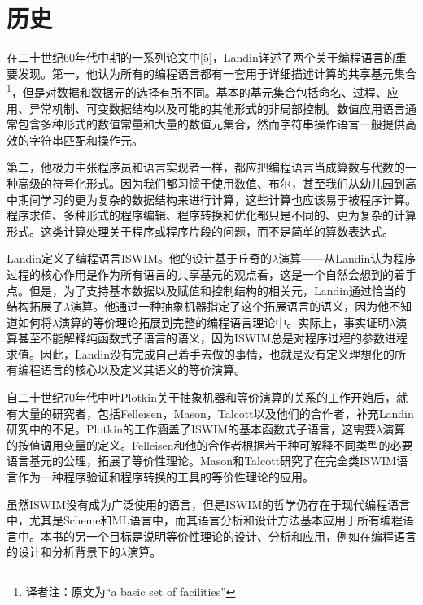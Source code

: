 \documentclass{book}
\begin{document}
\section{历史}
在二十世纪60年代中期的一系列论文中[5]，Landin详述了两个关于编程语言的重要发现。第一，他认为所有的编程语言都有一套用于详细描述计算的共享基元集合\footnote{译者注：原文为“a basic set of facilities”}，但是对数据和数据元的选择有所不同。基本的基元集合包括命名、过程、应用、异常机制、可变数据结构以及可能的其他形式的非局部控制。数值应用语言通常包含多种形式的数值常量和大量的数值元集合，然而字符串操作语言一般提供高效的字符串匹配和操作元。\par
第二，他极力主张程序员和语言实现者一样，都应把编程语言当成算数与代数的一种高级的符号化形式。因为我们都习惯于使用数值、布尔，甚至我们从幼儿园到高中期间学习的更为复杂的数据结构来进行计算，这些计算也应该易于被程序计算。程序求值、多种形式的程序编辑、程序转换和优化都只是不同的、更为复杂的计算形式。这类计算处理关于程序或程序片段的问题，而不是简单的算数表达式。\par
Landin定义了编程语言ISWIM。他的设计基于丘奇的$\lambda$演算——从Landin认为程序过程的核心作用是作为所有语言的共享基元的观点看，这是一个自然会想到的着手点。但是，为了支持基本数据以及赋值和控制结构的相关元，Landin通过恰当的结构拓展了$\lambda$演算。他通过一种抽象机器指定了这个拓展语言的语义，因为他不知道如何将$\lambda$演算的等价理论拓展到完整的编程语言理论中。实际上，事实证明$\lambda$演算甚至不能解释纯函数式子语言的语义，因为ISWIM总是对程序过程的参数进程求值。因此，Landin没有完成自己着手去做的事情，也就是没有定义理想化的所有编程语言的核心以及定义其语义的等价演算。\par
自二十世纪70年代中叶Plotkin关于抽象机器和等价演算的关系的工作开始后，就有大量的研究者，包括Felleisen，Mason，Talcott以及他们的合作者，补充Landin研究中的不足。Plotkin的工作涵盖了ISWIM的基本函数式子语言，这需要$\lambda$演算的按值调用变量的定义。Felleisen和他的合作者根据若干种可解释不同类型的必要语言基元的公理，拓展了等价性理论。Mason和Talcott研究了在完全类ISWIM语言作为一种程序验证和程序转换的工具的等价性理论的应用。\par
虽然ISWIM没有成为广泛使用的语言，但是ISWIM的哲学仍存在于现代编程语言中，尤其是Scheme和ML语言中，而其语言分析和设计方法基本应用于所有编程语言中。本书的另一个目标是说明等价性理论的设计、分析和应用，例如在编程语言的设计和分析背景下的$\lambda$演算。
\end{document}
